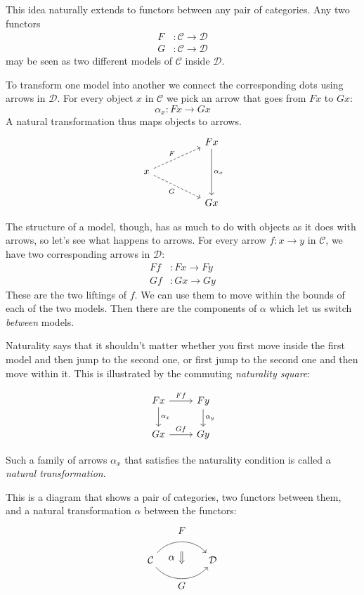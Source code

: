 \documentclass[DaoFP]{subfiles}
\begin{document}
This idea naturally extends to functors between any pair of categories. Any two functors
\begin{align*}
F &\colon \mathcal{C} \to \mathcal{D} \\
G &\colon \mathcal{C} \to \mathcal{D}
\end{align*}
may be seen as two different models of $\mathcal{C}$ inside $\mathcal{D}$. 

To transform one model into another we connect the corresponding dots using arrows in $\mathcal{D}$. For every object $x$ in $\mathcal{C}$ we pick an arrow that goes from $F x$ to $G x$:
\[ \alpha_x \colon F x \to G x \]
A natural transformation thus maps objects to arrows.
\[
 \begin{tikzcd}
 && F x
 \arrow[dd, "\alpha_x"]
 \\
 x
 \arrow[rru, dashed, "F"]
 \arrow[rrd, dashed, "G"']
 \\
 && G x
 \end{tikzcd}
\]


The structure of a model, though, has as much to do with objects as it does with arrows, so let's see what happens to arrows. For every arrow $f \colon x \to y$ in $\mathcal{C}$, we have two corresponding arrows in $\mathcal{D}$:
\begin{align*}
 F f &\colon F x \to F y \\
G f &\colon G x \to G y 
\end{align*}
These are the two liftings of $f$. We can use them to move within the bounds of each of the two models. Then there are the components of $\alpha$ which let us switch \emph{between} models. 

Naturality says that it shouldn't matter whether you first move inside the first model and then jump to the second one, or first jump to the second one and then move within it. This is illustrated by the commuting \emph{naturality square}:

\[
 \begin{tikzcd}
 F x
 \arrow[d, "\alpha_x"]
 \arrow[r, "F f"]
 &
F y
  \arrow[d, "\alpha_y"]
 \\
G x
 \arrow[r, "G f"]
& G y
 \end{tikzcd}
\]

Such a family of arrows $\alpha_x$ that satisfies the naturality condition is called a \emph{natural transformation}.

This is a diagram that shows a pair of categories, two functors between them, and a natural transformation $\alpha$ between the functors:
\[
\begin{tikzcd}[column sep=huge]
\mathcal{C}
  \arrow[bend left=50]{r}[name=U, label=above:$F$]{}
  \arrow[bend right=50]{r}[name=D, label=below:$G$]{} 
 &
\mathcal{D}
  \arrow[shorten <=10pt,shorten >=10pt,Rightarrow,to path={(U) -- node[label=left:$\alpha$] {} (D)}]{}
\end{tikzcd}
\]
\end{document}
